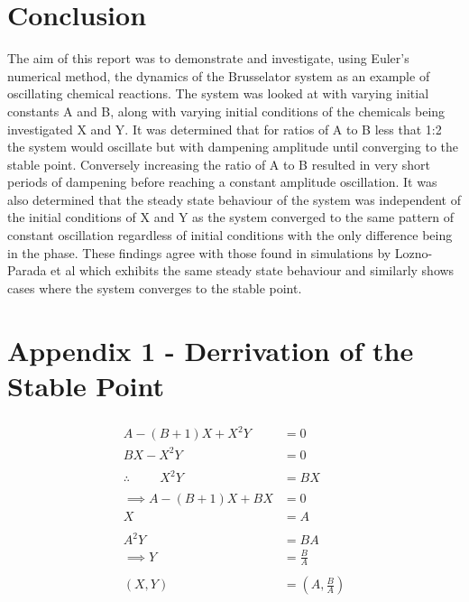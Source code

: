 \documentclass[reprint, amsmath, amssymb, aps]{revtex4-2}
\begin{document}
\section{Conclusion}
The aim of this report was to demonstrate and investigate, using Euler's numerical method, the dynamics of the Brusselator system as an example of oscillating chemical reactions. The system was looked at with varying initial constants A and B, along with varying initial conditions of the chemicals being investigated X and Y. It was determined that for ratios of A to B less that 1:2 the system would oscillate but with dampening amplitude until converging to the stable point. Conversely increasing the ratio of A to B resulted in very short periods of dampening before reaching a constant amplitude oscillation. It was also determined that the steady state behaviour of the system was independent of the initial conditions of X and Y as the system converged to the same pattern of constant oscillation regardless of initial conditions with the only difference being in the phase. These findings agree with those found in simulations by Lozno-Parada et al\cite{parada} which exhibits the same steady state behaviour and similarly shows cases where the system converges to the stable point.

\clearpage


\clearpage
\onecolumngrid
\section*{Appendix 1 - Derrivation of the Stable Point}
\begin{align*}
	\begin{aligned}
	A - (B + 1)X + X^2 Y &= 0\\
	BX - X^2 Y &= 0\\
	\\
	\therefore \hspace{1cm} X^2 Y &= BX\\
	\\
	\implies A - (B + 1)X + BX &= 0\\
	X &= A\\
	\\
	A^2 Y &= BA\\
	\implies Y &= \frac{B}{A}\\
	\\
	(X, Y) &= \left(A, \frac{B}{A}\right)
	\end{aligned}
\end{align*}
\end{document}

